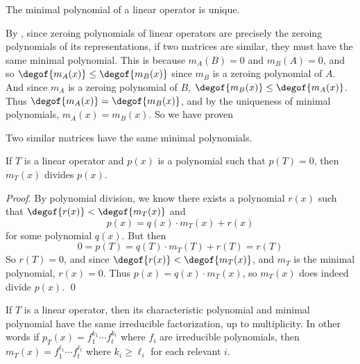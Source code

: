 \begin{prop*}

    The minimal polynomial of a linear operator is unique.

\end{prop*}

By , since zeroing polynomials of linear operators are precisely the zeroing polynomials of its representations, if two matrices are similar, they must have the same
minimal polynomial.
This is because $m_A(B)=0$ and $m_B(A)=0$, and so $\degof{m_A(x)}\leq\degof{m_B(x)}$ since $m_B$ is a zeroing polynomial of $A$.
And since $m_A$ is a zeroing polynomial of $B$, $\degof{m_B(x)}\leq\degof{m_A(x)}$.
Thus $\degof{m_A(x)}=\degof{m_B(x)}$, and by the uniqueness of minimal polynomials, $m_A(x)=m_B(x)$.
So we have proven

\begin{prop*}

    Two similar matrices have the same minimal polynomials.

\end{prop*}

\begin{prop*}[minimalDividesZeroing]

    If $T$ is a linear operator and $p(x)$ is a polynomial such that $p(T)=0$, then $m_T(x)$ divides $p(x)$.

\end{prop*}

\begin{proof}

    By polynomial division, we know there exists a polynomial $r(x)$ such that $\degof{r(x)}<\degof{m_T(x)}$ and
    \[ p(x) = q(x)\cdot m_T(x) + r(x) \]
    for some polynomial $q(x)$.
    But then
    \[ 0 = p(T) = q(T)\cdot m_T(T) + r(T) = r(T) \]
    So $r(T)=0$, and since $\degof{r(x)}<\degof{m_T(x)}$, and $m_T$ is the minimal polynomial, $r(x)=0$.
    Thus $p(x)=q(x)\cdot m_T(x)$, so $m_T(x)$ does indeed divide $p(x)$.
    \qed

\end{proof}

\begin{thrm*}

    If $T$ is a linear operator, then its characteristic polynomial and minimal polynomial have the same irreducible factorization, up to multiplicity.
    In other words if $p_T(x)=f_1^{k_1}\cdots f_t^{k_t}$ where $f_i$ are irreducible polynomials, then $m_T(x)=f_1^{\ell_1}\cdots f_t^{\ell_t}$ where $k_i\geq\ell_i$ for each relevant $i$.

\end{thrm*}

